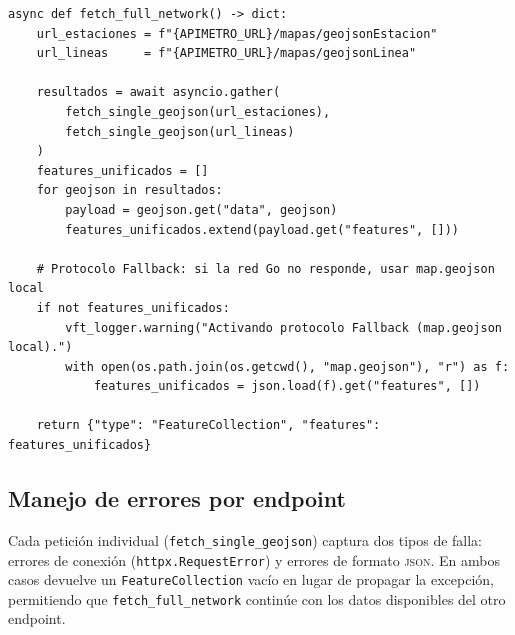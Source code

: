 \begin{lstlisting}[style=estiloPython,
    caption={Descarga paralela y unificación de capas espaciales de Apimetro.
             \texttt{src/infrastructure/go\_client/client.py}.},
    label=lst:vft-goclient]
async def fetch_full_network() -> dict:
    url_estaciones = f"{APIMETRO_URL}/mapas/geojsonEstacion"
    url_lineas     = f"{APIMETRO_URL}/mapas/geojsonLinea"

    resultados = await asyncio.gather(
        fetch_single_geojson(url_estaciones),
        fetch_single_geojson(url_lineas)
    )
    features_unificados = []
    for geojson in resultados:
        payload = geojson.get("data", geojson)
        features_unificados.extend(payload.get("features", []))

    # Protocolo Fallback: si la red Go no responde, usar map.geojson local
    if not features_unificados:
        vft_logger.warning("Activando protocolo Fallback (map.geojson local).")
        with open(os.path.join(os.getcwd(), "map.geojson"), "r") as f:
            features_unificados = json.load(f).get("features", [])

    return {"type": "FeatureCollection", "features": features_unificados}
\end{lstlisting}

\subsection*{Manejo de errores por endpoint}

Cada petición individual (\texttt{fetch\_single\_geojson}) captura dos tipos de
falla: errores de conexión (\texttt{httpx.RequestError}) y errores de formato
\textsc{json}. En ambos casos devuelve un \texttt{FeatureCollection} vacío en
lugar de propagar la excepción, permitiendo que \texttt{fetch\_full\_network}
continúe con los datos disponibles del otro endpoint.
